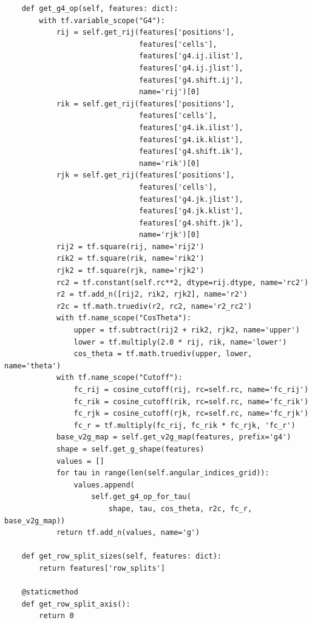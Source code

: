\documentclass[final,1p,times]{elsarticle}
\begin{document}
\begin{verbatim}
    def get_g4_op(self, features: dict):
        with tf.variable_scope("G4"):
            rij = self.get_rij(features['positions'],
                               features['cells'],
                               features['g4.ij.ilist'],
                               features['g4.ij.jlist'],
                               features['g4.shift.ij'],
                               name='rij')[0]
            rik = self.get_rij(features['positions'],
                               features['cells'],
                               features['g4.ik.ilist'],
                               features['g4.ik.klist'],
                               features['g4.shift.ik'],
                               name='rik')[0]
            rjk = self.get_rij(features['positions'],
                               features['cells'],
                               features['g4.jk.jlist'],
                               features['g4.jk.klist'],
                               features['g4.shift.jk'],
                               name='rjk')[0]
            rij2 = tf.square(rij, name='rij2')
            rik2 = tf.square(rik, name='rik2')
            rjk2 = tf.square(rjk, name='rjk2')
            rc2 = tf.constant(self.rc**2, dtype=rij.dtype, name='rc2')
            r2 = tf.add_n([rij2, rik2, rjk2], name='r2')
            r2c = tf.math.truediv(r2, rc2, name='r2_rc2')
            with tf.name_scope("CosTheta"):
                upper = tf.subtract(rij2 + rik2, rjk2, name='upper')
                lower = tf.multiply(2.0 * rij, rik, name='lower')
                cos_theta = tf.math.truediv(upper, lower, name='theta')
            with tf.name_scope("Cutoff"):
                fc_rij = cosine_cutoff(rij, rc=self.rc, name='fc_rij')
                fc_rik = cosine_cutoff(rik, rc=self.rc, name='fc_rik')
                fc_rjk = cosine_cutoff(rjk, rc=self.rc, name='fc_rjk')
                fc_r = tf.multiply(fc_rij, fc_rik * fc_rjk, 'fc_r')
            base_v2g_map = self.get_v2g_map(features, prefix='g4')
            shape = self.get_g_shape(features)
            values = []
            for tau in range(len(self.angular_indices_grid)):
                values.append(
                    self.get_g4_op_for_tau(
                        shape, tau, cos_theta, r2c, fc_r, base_v2g_map))
            return tf.add_n(values, name='g')

    def get_row_split_sizes(self, features: dict):
        return features['row_splits']

    @staticmethod
    def get_row_split_axis():
        return 0


\end{verbatim}
\end{document}

